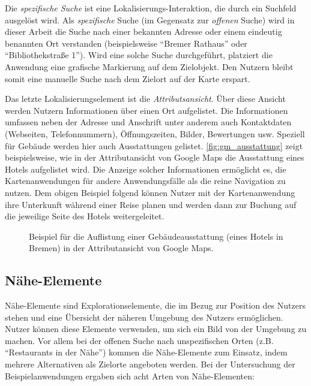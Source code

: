 Die \emph{spezifische Suche} ist eine Lokalisierungs-Interaktion, die durch ein Suchfeld ausgelöst wird.
Als \emph{spezifische} Suche (im Gegensatz zur \emph{offenen} Suche) wird in dieser Arbeit die Suche nach einer bekannten Adresse oder einem eindeutig benannten Ort verstanden (beispielsweise \enquote{Bremer Rathaus} oder \enquote{Bibliothekstraße 1}).
Wird eine solche Suche durchgeführt, platziert die Anwendung eine grafische Markierung auf dem Zielobjekt.
Den Nutzern bleibt somit eine manuelle Suche nach dem Zielort auf der Karte erspart.

Das letzte Lokalisierungselement ist die \emph{Attributsansicht}.
Über diese Ansicht werden Nutzern Informationen über einen Ort aufgelistet.
Die Informationen umfassen neben der Adresse und Anschrift unter anderem auch Kontaktdaten (Webseiten, Telefonnummern), Öffnungszeiten, Bilder, Bewertungen usw.
Speziell für Gebäude werden hier auch Ausstattungen gelistet.
\autoref{fig:gm_ausstattung} zeigt beispielsweise, wie in der Attributansicht von Google Maps die Ausstattung eines Hotels aufgelistet wird.
Die Anzeige solcher Informationen ermöglicht es, die Kartenanwendungen für andere Anwendungsfälle als die reine Navigation zu nutzen.
Dem obigen Beispiel folgend können Nutzer mit der Kartenanwendung ihre Unterkunft während einer Reise planen und werden dann zur Buchung auf die jeweilige Seite des Hotels weitergeleitet.
\begin{figure}[t]
	\centering
	\caption{Beispiel für die Auflistung einer Gebäudeausstattung (eines Hotels in Bremen) in der Attributansicht von Google Maps.}
	\label{fig:gm_ausstattung}
\end{figure}

\subsection{Nähe-Elemente}
\label{ssec:prox-elements}
Nähe-Elemente sind Explorationselemente, die im Bezug zur Position des Nutzers stehen und eine Übersicht der näheren Umgebung des Nutzers ermöglichen.
Nutzer können diese Elemente verwenden, um sich ein Bild von der Umgebung zu machen.
Vor allem bei der offenen Suche nach unspezifischen Orten (z.B. \enquote{Restaurants in der Nähe}) kommen die Nähe-Elemente zum Einsatz, indem mehrere Alternativen als Zielorte angeboten werden.
Bei der Untersuchung der Beispielanwendungen ergaben sich acht Arten von Nähe-Elementen:


